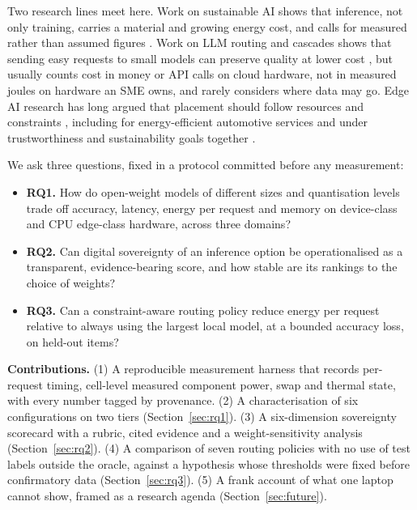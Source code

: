 \documentclass[10pt,twocolumn]{article}
\begin{document}
Two research lines meet here. Work on sustainable AI shows that inference, not only training, carries a material and growing energy cost, and calls for measured rather than assumed figures \cite{strubell2019,schwartz2020,henderson2020,wu2022,luccioni2024,samsi2023}. Work on LLM routing and cascades shows that sending easy requests to small models can preserve quality at lower cost \cite{frugalgpt,routellm,hybridllm}, but usually counts cost in money or API calls on cloud hardware, not in measured joules on hardware an SME owns, and rarely considers where data may go. Edge AI research has long argued that placement should follow resources and constraints \cite{varghese2021,ding2022roadmap}, including for energy-efficient automotive services \cite{katare2023} and under trustworthiness and sustainability goals together \cite{dingtrust2021}.

We ask three questions, fixed in a protocol committed before any measurement:
\begin{itemize}\setlength\itemsep{0pt}
\item \textbf{RQ1.} How do open-weight models of different sizes and quantisation levels trade off accuracy, latency, energy per request and memory on device-class and CPU edge-class hardware, across three domains?
\item \textbf{RQ2.} Can digital sovereignty of an inference option be operationalised as a transparent, evidence-bearing score, and how stable are its rankings to the choice of weights?
\item \textbf{RQ3.} Can a constraint-aware routing policy reduce energy per request relative to always using the largest local model, at a bounded accuracy loss, on held-out items?
\end{itemize}

\textbf{Contributions.} (1) A reproducible measurement harness that records per-request timing, cell-level measured component power, swap and thermal state, with every number tagged by provenance. (2) A characterisation of six configurations on two tiers (Section~\ref{sec:rq1}). (3) A six-dimension sovereignty scorecard with a rubric, cited evidence and a weight-sensitivity analysis (Section~\ref{sec:rq2}). (4) A comparison of seven routing policies with no use of test labels outside the oracle, against a hypothesis whose thresholds were fixed before confirmatory data (Section~\ref{sec:rq3}). (5) A frank account of what one laptop cannot show, framed as a research agenda (Section~\ref{sec:future}).
\end{document}
